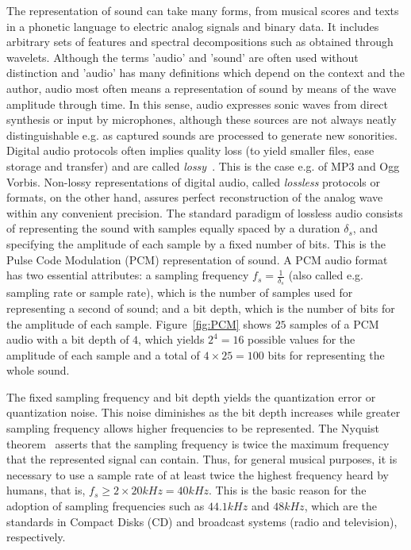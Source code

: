 The representation of sound can take many forms,
from musical scores and texts in a phonetic language to electric analog signals and binary data.
It includes arbitrary sets of features and spectral decompositions such as obtained through wavelets.
Although the terms 'audio' and 'sound' are often used without distinction
and 'audio' has many definitions which depend on the context and the author,
audio most often means a representation of sound by means
of the wave amplitude through time.
In this sense,
audio expresses sonic waves from direct synthesis or input by microphones,
although these sources are not always neatly distinguishable
e.g. as captured sounds are processed to generate new sonorities.
Digital audio protocols often implies quality loss (to yield smaller files, ease storage and transfer)
and are called \emph{lossy}~\cite{loss}.
This is the case e.g. of MP3 and Ogg Vorbis.
Non-lossy representations of digital audio, called \emph{lossless} protocols or formats,
on the other hand, assures perfect reconstruction of the analog wave within any convenient precision.
The standard paradigm of lossless audio consists of
representing the sound with samples equally spaced
by a duration $\delta_s$, and specifying the amplitude of each sample by a fixed number of bits.
This is the Pulse Code Modulation (PCM) representation of sound.
A PCM audio format has two essential attributes:
a sampling frequency $f_s=\frac{1}{\delta_s}$ (also called e.g. sampling rate or sample rate),
which is the number of samples used for representing a second of sound;
and a bit depth, which is the number of bits for the amplitude of each sample.
Figure~\ref{fig:PCM} shows $25$ samples of a PCM audio with a bit depth of $4$,
which yields $2^4=16$ possible values for the amplitude of each sample
and a total of $4 \times 25= 100$ bits for representing the whole sound.

The fixed sampling frequency and bit depth
yields the quantization error or quantization noise.
This noise diminishes as the bit depth increases
while greater sampling frequency allows higher frequencies to be represented.
The Nyquist theorem~\cite{Openheim} asserts that the sampling frequency
is twice the maximum frequency that the represented signal can contain.
Thus, for general musical purposes, it is necessary to use a sample rate of
at least twice the highest frequency heard by humans,
that is, $f_s \geq 2\times 20kHz = 40kHz$.
This is the basic reason for the adoption of sampling frequencies
such as $44.1kHz$ and $48kHz$,
which are the standards in Compact Disks (CD)
and broadcast systems (radio and television), respectively.

